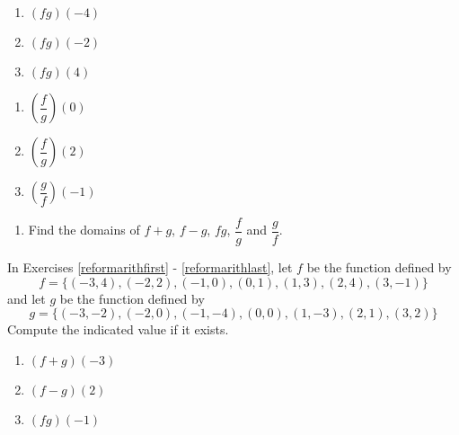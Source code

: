 \begin{multicols}{3}
\begin{enumerate}
\setcounter{enumi}{\value{HW}}

\item $(fg)(-4)$ 
\item $(fg)(-2)$
\item $(fg)(4)$

\setcounter{HW}{\value{enumi}}
\end{enumerate}
\end{multicols}

\enlargethispage{0.5in}

\begin{multicols}{3}
\begin{enumerate}
\setcounter{enumi}{\value{HW}}

\item $\left(\dfrac{f}{g}\right)(0)$
\item $\left(\dfrac{f}{g}\right)(2)$
\item $\left(\dfrac{g}{f}\right)(-1)$ 

\setcounter{HW}{\value{enumi}}
\end{enumerate}
\end{multicols}

\begin{enumerate}
\setcounter{enumi}{\value{HW}}

\item Find the domains of $f+g$, $f-g$,  $fg$, $\dfrac{f}{g}$ and $\dfrac{g}{f}$.  \label{arithfromgraphlast}

\setcounter{HW}{\value{enumi}}
\end{enumerate}

In Exercises \ref{reformarithfirst} - \ref{reformarithlast}, let $f$ be the function defined by \[f = \{(-3, 4), (-2, 2), (-1, 0), (0, 1), (1, 3), (2, 4), (3, -1)\}\] and let $g$ be the function defined by \[g = \{(-3, -2), (-2, 0), (-1, -4), (0, 0), (1, -3), (2, 1), (3, 2)\}\] Compute the indicated value if it exists.


\begin{multicols}{3}
\begin{enumerate}
\setcounter{enumi}{\value{HW}}

\item $(f + g)(-3)$ \label{reformarithfirst}
\item $(f - g)(2)$
\item $(fg)(-1)$

\setcounter{HW}{\value{enumi}}
\end{enumerate}
\end{multicols}

